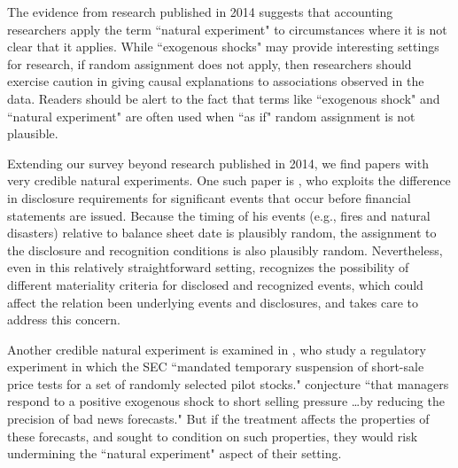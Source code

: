 \documentclass[12pt,reqno,titlepage]{amsart}
\begin{document}
\begin{doublespace}
The evidence from research published in 2014 suggests that accounting researchers apply the term ``natural experiment" to circumstances where it is not clear that it applies. While ``exogenous shocks" may provide interesting settings for research, if random assignment does not apply, then researchers should exercise caution in giving causal explanations to associations observed in the data. Readers should be alert to the fact that terms like ``exogenous shock" and ``natural experiment" are often used when ``as if" random assignment is not plausible.

Extending our survey beyond research published in 2014, we find papers with very credible natural experiments.
One such paper is \citet{Michels:2015aa}, who exploits the difference in disclosure requirements for significant events that occur before financial statements are issued. 
Because the timing of his events (e.g., fires and natural disasters) relative to balance sheet date is plausibly random, the assignment to the disclosure and recognition conditions is also plausibly random. 
Nevertheless, even in this relatively straightforward setting, \citet{Michels:2015aa} recognizes the possibility of different materiality criteria for disclosed and recognized events, which could affect the relation been underlying events and disclosures, and takes care to address this concern.

Another credible natural experiment is examined in \citet[p.\,80]{Li:2015he}, who study a regulatory experiment in which the SEC ``mandated temporary suspension of short-sale price tests for a set of randomly selected pilot stocks." 
\citet[p.\,79]{Li:2015he} conjecture ``that managers respond to a positive exogenous shock to short selling pressure \dots by reducing the precision of bad news forecasts." 
But if the treatment affects the properties of these forecasts, and \citet[p.\,79]{Li:2015he} sought to condition on such properties, they would risk undermining the ``natural experiment" aspect of their setting.



\end{doublespace}
\end{document}
